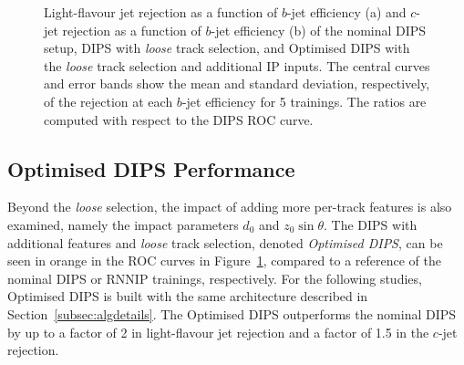 \begin{figure}[htbp!]
    \centering
    \caption{Light-flavour jet rejection as a function of $b$-jet efficiency (a) and $c$-jet rejection as a function of $b$-jet efficiency (b) of the nominal DIPS setup, DIPS with \emph{loose} track selection, and Optimised DIPS with the \emph{loose} track selection and additional IP inputs. The central curves and error bands show the mean and standard deviation, respectively, of the rejection at each $b$-jet efficiency for 5 trainings. The ratios are computed with respect to the DIPS ROC curve.}
    \label{fig:ip3d_cuts}
\end{figure}


\subsection{Optimised DIPS Performance}
\label{subsec:optimiseddips}

Beyond the \textit{loose} selection, the impact of adding more per-track features is also examined, namely the impact parameters $d_0$ and $z_0 \sin\theta$. 
The DIPS with additional features and \textit{loose} track selection, denoted \textit{Optimised DIPS}, can be seen in orange in the ROC curves in Figure~\ref{fig:ip3d_cuts}, compared to a reference of the nominal DIPS or RNNIP trainings, respectively. 
For the following studies, Optimised DIPS is built with the same architecture described in Section~\ref{subsec:algdetails}.
The Optimised DIPS outperforms the nominal DIPS  by up to a factor of 2 in light-flavour jet rejection and a factor of 1.5 in the $c$-jet rejection.


